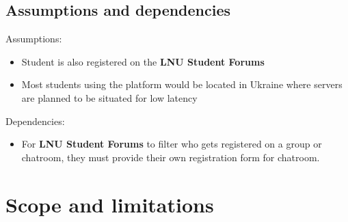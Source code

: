 \documentclass[12pt]{article}
\begin{document}
	\subsection{Assumptions and dependencies}
	Assumptions:
	\begin{itemize}
		\item Student is also registered on the \textbf{LNU Student Forums}
		\item Most students using the platform would be located in Ukraine where servers are planned to be situated for low latency
	\end{itemize}
	Dependencies:
	\begin{itemize}
		\item For \textbf{LNU Student Forums} to filter who gets registered on a group or chatroom, they must provide their own registration form for chatroom.
	\end{itemize}
	\section{Scope and limitations}
\end{document}
